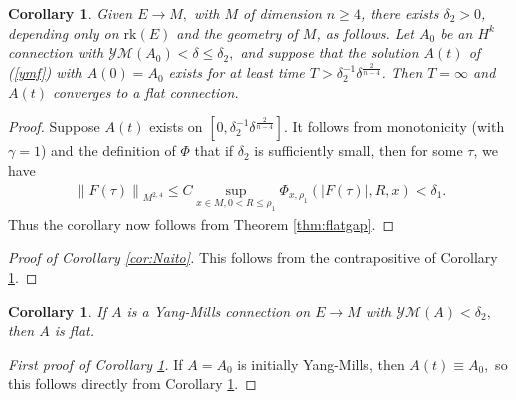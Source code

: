 \documentclass[12pt]{amsart}
\newcommand{\YM}{\mathcal{YM}}
\renewcommand{\1}{{\mathbf 1}}
\newcommand{\rk}{{\mathrm{rk}}}
\newtheorem{cor}[thm]{Corollary}
\theoremstyle{others}
\numberwithin{equation}{section}
\begin{document}
\begin{cor}\label{cor:lowYMandtimeoneimpliesconvergence}
    Given $E \to M,$ with \(M\) of dimension \(n \geq 4\), there exists $\delta_2 > 0$, depending only on $\rk(E)$ and the geometry of \(M\), as follows. Let $A_0$ be an \(H^k\) connection with $\YM(A_0)  < \delta \leq \delta_2,$ and suppose that the solution $A(t)$ of (\ref{ymf}) with $A(0) = A_0$ exists for at least time $T > \delta_2^{-1}\delta^{\frac{2}{n-4}}$. Then $T = \infty$ and \(A(t)\) %
    converges to a flat connection.
\end{cor}
\begin{proof}%
    Suppose \(A(t)\) exists on \(\left[0, \delta_2^{-1}\delta^{\frac{2}{n-4}}\right]\). It follows from monotonicity \cite[Theorem 5.7]{oliveirawaldron} (with \(\gamma = 1\)) and the definition of \(\Phi\) that if \(\delta_2\) is sufficiently small, then for some \(\tau\), we have
    \begin{align*}
        \left\|F\left(\tau\right)\right\|_{M^{2,4}} \leq C\sup_{x \in M, 0 < R \leq \rho_1} \Phi_{x, \rho_1}\left(\left|F(\tau)\right|, R, x\right) < \delta_1.
    \end{align*} Thus the corollary now follows from Theorem \ref{thm:flatgap}.
\end{proof}



\begin{proof}[Proof of Corollary \ref{cor:Naito}]
This follows from the contrapositive of Corollary \ref{cor:lowYMandtimeoneimpliesconvergence}.
\end{proof}





\begin{cor}\label{cor:ellipticgap}
    If $A$ is a %
    Yang-Mills connection on $E \to M$ with $\YM(A) < \delta_2,$ then $A$ is flat.
\end{cor}

\begin{proof}[First proof of Corollary \ref{cor:ellipticgap}]
If $A = A_0$ is initially Yang-Mills, then $A(t) \equiv A_0,$ so this follows directly from Corollary \ref{cor:lowYMandtimeoneimpliesconvergence}.
\end{proof}
\end{document}
